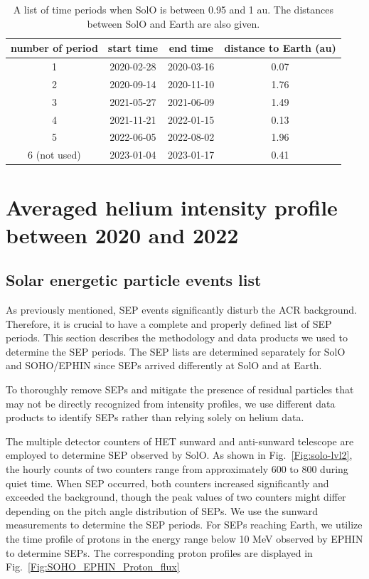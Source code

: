 \begin{table}[!htb]
    \centering
    \caption[Time periods when \ac{SolO} closed to 1 au]{A list of time periods when \ac{SolO} is between 0.95 and 1 au. The distances between \ac{SolO} and Earth are also given.}
    \label{tab:1AU_period}
    \begin{tabular}{|c|c|c|c|}
    \hline
    number of period & start time & end time & distance to Earth  (au)\\
    \hline
    1   & 2020-02-28 & 2020-03-16   & 0.07 \\
    \hline
    2   & 2020-09-14 & 2020-11-10   & 1.76 \\
    \hline
    3   & 2021-05-27 & 2021-06-09   & 1.49 \\
    \hline
    4   & 2021-11-21 & 2022-01-15   & 0.13 \\
    \hline
    5   & 2022-06-05 & 2022-08-02   & 1.96 \\
    \hline
    6 (not used)    & 2023-01-04 & 2023-01-17   & 0.41 \\
    \hline
    \end{tabular}
\end{table}

\section{Averaged helium intensity profile between 2020 and 2022}
\subsection*{Solar energetic particle events list}
\label{sec:sep_list_acr}

As previously mentioned, \ac{SEP} events significantly disturb the \ac{ACR} background. Therefore, it is crucial to have a complete and properly defined list of \ac{SEP} periods. This section describes the methodology and data products we used to determine the \ac{SEP} periods. The \ac{SEP} lists are determined separately for \ac{SolO} and \ac{SOHO}/\ac{EPHIN} since \acp{SEP} arrived differently at \ac{SolO} and at Earth. 

To thoroughly remove \acp{SEP} and mitigate the presence of residual particles that may not be directly recognized from intensity profiles, we use different data products to identify \acp{SEP} rather than relying solely on helium data.

The multiple detector counters of \ac{HET} sunward and anti-sunward telescope are employed to determine \ac{SEP} observed by \ac{SolO}. As shown in Fig.~\ref{Fig:solo-lvl2}, the hourly counts of two counters range from approximately 600 to 800 during quiet time. When \ac{SEP} occurred, both counters increased significantly and exceeded the background, though the peak values of two counters might differ depending on the pitch angle distribution of \acp{SEP}. We use the sunward measurements to determine the \ac{SEP} periods. 
For \acp{SEP} reaching Earth, we utilize the time profile of protons in the energy range below 10 MeV observed by \ac{EPHIN} to determine \acp{SEP}. The corresponding proton profiles are displayed in Fig.~\ref{Fig:SOHO_EPHIN_Proton_flux}

